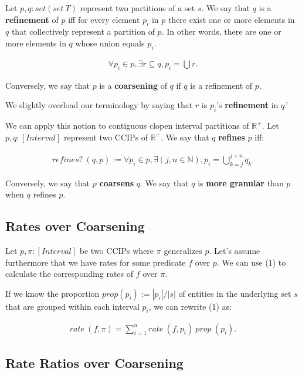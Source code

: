 \documentclass[]{article}
\begin{document}
Let \(p, q : set (set\ T)\) represent two partitions of a set \(s\). We
say that \(q\) is a \textbf{refinement} of \(p\) iff for every element
\(p_i\) in \(p\) there exist one or more elements in \(q\) that
collectively represent a partition of \(p\). In other words, there are
one or more elements in \(q\) whose union equals \(p_i\).

\begin{align*}
\forall p_i \in p, \exists r \subseteq q, p_i = \bigcup r. 
\end{align*}

Conversely, we say that \(p\) is a \textbf{coarsening} of \(q\) if \(q\)
is a refinement of \(p\).

We slightly overload our terminology by saying that \(r\) is \(p_i\)'s
\textbf{refinement} in \(q\).'

We can apply this notion to contiguous clopen interval partitions of
\(\mathbb{R}^+\). Let \(p, q : [Interval]\) represent two CCIPs of
\(\mathbb{R}^+\). We say that \(q\) \textbf{refines} \(p\) iff:

\begin{align*}
refines?\ (q, p) := \forall p_i \in p, \exists (j, n \in \mathbb{N}), p_i = \bigcup_{k=j}^{j+n} q_k.
\end{align*}

Conversely, we say that \(p\) \textbf{coarsens} \(q\). We say that \(q\)
is \textbf{more granular} than \(p\) when \(q\) refines \(p\).

\hypertarget{rates-over-coarsening}{%
\subsection{Rates over Coarsening}\label{rates-over-coarsening}}

Let \(p, \pi : [Interval]\) be two CCIPs where \(\pi\) generalizes
\(p\). Let's assume furthermore that we have rates for some predicate
\(f\) over \(p\). We can use (1) to calculate the corresponding rates of
\(f\) over \(\pi\).

If we know the proportion \(prop (p_i) := |p_i|/|s|\) of entities in the
underlying set \(s\) that are grouped within each interval \(p_i\), we
can rewrite (1) as:

\begin{align*}
rate\ (f, \pi) = \sum_{i = 1}^n rate\ (f, p_i)\ prop\ (p_i).
\end{align*}

\hypertarget{rate-ratios-over-coarsening}{%
\subsection{Rate Ratios over
Coarsening}\label{rate-ratios-over-coarsening}}
\end{document}
